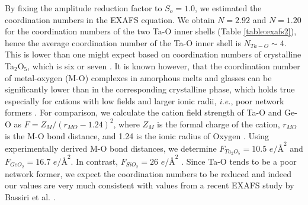 By fixing the amplitude reduction factor to  $S_{o} = 1.0$, we estimated the coordination numbers in the EXAFS equation. We obtain $N = 2.92$ and $N = 1.20$ for the coordination numbers of the two Ta-O inner shells (Table \ref{table:exafs2}), hence the average coordination number of the Ta-O inner shell is $N_{Ta-O} \sim 4$. This is lower than one might expect based on coordination numbers of crystalline Ta$_{2}$O$_{5}$, which is six or seven \cite{Aleshina2002, Lee2013, Stephenson1971}. It is known however, that the coordination number of metal-oxygen (M-O) complexes in amorphous melts and glasses can be significantly lower than in the corresponding crystalline phase, which holds true especially for cations with low fields and larger ionic radii, \emph{i.e.}, poor network formers \cite{Skinner2014}. For comparison, we calculate the cation field strength of Ta-O and Ge-O as $F = Z_{M}/(r_{MO} - 1.24)^{2}$, where $Z_{M}$ is the formal charge of the cation, $r_{MO}$ is the M-O bond distance, and 1.24 is the ionic radius of Oxygen \cite{Shannon1969}. Using experimentally derived M-O bond distances, we determine $F_{Ta_{2}O_{5}} = 10.5$ $e/\text{\AA}^{2}$ and $F_{GeO_{2}} = 16.7$ $e/\text{\AA}^{2}$. In contrast, $F_{SiO_{2}} = 26$ $e/\text{\AA}^{2}$ \cite{Skinner2014}. Since Ta-O tends to be a poor network former, we expect the coordination numbers to be reduced and indeed our values are very much consistent with values from a recent EXAFS study by Bassiri et al. \cite{Bassiri2015}.

